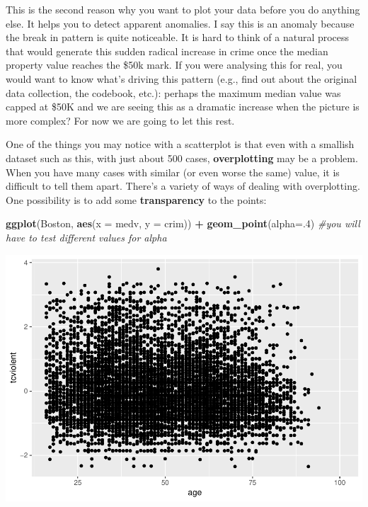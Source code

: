 \documentclass[]{book}
\newenvironment{Shaded}{\begin{snugshade}}{\end{snugshade}}
\newcommand{\CommentTok}[1]{\textcolor[rgb]{0.56,0.35,0.01}{\textit{#1}}}
\newcommand{\DataTypeTok}[1]{\textcolor[rgb]{0.13,0.29,0.53}{#1}}
\newcommand{\DecValTok}[1]{\textcolor[rgb]{0.00,0.00,0.81}{#1}}
\newcommand{\KeywordTok}[1]{\textcolor[rgb]{0.13,0.29,0.53}{\textbf{#1}}}
\newcommand{\NormalTok}[1]{#1}
\newcommand{\OperatorTok}[1]{\textcolor[rgb]{0.81,0.36,0.00}{\textbf{#1}}}
\newcommand{\StringTok}[1]{\textcolor[rgb]{0.31,0.60,0.02}{#1}}
\theoremstyle{definition}
\theoremstyle{definition}
\theoremstyle{definition}
\theoremstyle{remark}
\begin{document}
This is the second reason why you want to plot your data before you do
anything else. It helps you to detect apparent anomalies. I say this is
an anomaly because the break in pattern is quite noticeable. It is hard
to think of a natural process that would generate this sudden radical
increase in crime once the median property value reaches the \$50k mark.
If you were analysing this for real, you would want to know what's
driving this pattern (e.g., find out about the original data collection,
the codebook, etc.): perhaps the maximum median value was capped at
\$50K and we are seeing this as a dramatic increase when the picture is
more complex? For now we are going to let this rest.

One of the things you may notice with a scatterplot is that even with a
smallish dataset such as this, with just about 500 cases,
\textbf{overplotting} may be a problem. When you have many cases with
similar (or even worse the same) value, it is difficult to tell them
apart. There's a variety of ways of dealing with overplotting. One
possibility is to add some \textbf{transparency} to the points:

\begin{Shaded}
\begin{Highlighting}[]
\KeywordTok{ggplot}\NormalTok{(Boston, }\KeywordTok{aes}\NormalTok{(}\DataTypeTok{x =}\NormalTok{ medv, }\DataTypeTok{y =}\NormalTok{ crim)) }\OperatorTok{+}
\StringTok{  }\KeywordTok{geom_point}\NormalTok{(}\DataTypeTok{alpha=}\NormalTok{.}\DecValTok{4}\NormalTok{) }\CommentTok{#you will have to test different values for alpha}
\end{Highlighting}
\end{Shaded}

\includegraphics{03-visualisation_files/figure-latex/unnamed-chunk-36-1.pdf}
\end{document}
